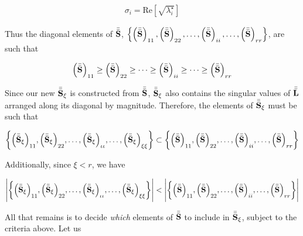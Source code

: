\documentclass[../../ClusteringConnectionsMAIN.tex]{subfiles}
\begin{document}
\begin{flushleft}
\begin{large}
\begin{align}
\sigma_i = \text{Re} \left[ \sqrt{ \lambda^\star_i } \right]
\end{align}


Thus the diagonal elements of $\bar{\bar{\mathbf{S}}}$, $\left\{ \left( \bar{\bar{\mathbf{S}}} \right)_{11}, \left( \bar{\bar{\mathbf{S}}} \right)_{22}, \dots, \left( \bar{\bar{\mathbf{S}}} \right)_{ii}, \dots, \left( \bar{\bar{\mathbf{S}}} \right)_{rr} \right\}$, are such that 

\begin{align*}
\left( \bar{\bar{\mathbf{S}}} \right)_{11} \geq \left( \bar{\bar{\mathbf{S}}} \right)_{22} \geq \cdots \geq \left( \bar{\bar{\mathbf{S}}} \right)_{ii} \geq \cdots \geq \left( \bar{\bar{\mathbf{S}}} \right)_{rr}
\end{align*}

Since our new $\bar{\bar{\mathbf{S}}}_\xi$ is constructed from $\bar{\bar{\mathbf{S}}}$, $\bar{\bar{\mathbf{S}}}_\xi$ also contains the singular values of $\bar{\bar{\mathbf{L}}}$ arranged along its diagonal by magnitude.  Therefore, the elements of $\bar{\bar{\mathbf{S}}}_\xi$ must be such that 

\begin{align*}
\biggl\{ \Bigl( \bar{\bar{\mathbf{S}}}_\xi \Bigr)_{11}, \Bigl( \bar{\bar{\mathbf{S}}}_\xi \Bigr)_{22}, \dots, \Bigl( \bar{\bar{\mathbf{S}}}_\xi \Bigr)_{\iota \iota}, \dots, \Bigl( \bar{\bar{\mathbf{S}}}_\xi \Bigr)_{\xi \xi} \biggr\} \subset \biggl\{ \Bigl( \bar{\bar{\mathbf{S}}} \Bigr)_{11}, \Bigl( \bar{\bar{\mathbf{S}}} \Bigr)_{22}, \dots, \Bigl( \bar{\bar{\mathbf{S}}} \Bigr)_{ii}, \dots, \Bigl( \bar{\bar{\mathbf{S}}} \Bigr)_{rr} \biggr\}
\end{align*}

Additionally, since $\xi < r$, we have 

\begin{align*}
\Biggl| \biggl\{ \Bigl( \bar{\bar{\mathbf{S}}}_\xi \Bigr)_{11}, \Bigl( \bar{\bar{\mathbf{S}}}_\xi \Bigr)_{22}, \dots, \Bigl( \bar{\bar{\mathbf{S}}}_\xi \Bigr)_{\iota \iota}, \dots, \Bigl( \bar{\bar{\mathbf{S}}}_\xi \Bigr)_{\xi \xi} \biggr\} \Biggr| < \Biggl| \biggl\{ \Bigl( \bar{\bar{\mathbf{S}}} \Bigr)_{11}, \Bigl( \bar{\bar{\mathbf{S}}} \Bigr)_{22}, \dots, \Bigl( \bar{\bar{\mathbf{S}}} \Bigr)_{ii}, \dots, \Bigl( \bar{\bar{\mathbf{S}}} \Bigr)_{rr} \biggr\} \Biggr|
\end{align*}

All that remains is to decide \emph{which} elements of $\bar{\bar{\mathbf{S}}}$ to include in $\bar{\bar{\mathbf{S}}}_\xi$, subject to the criteria above.  Let us 




























\end{large}
\end{flushleft}
\end{document}
